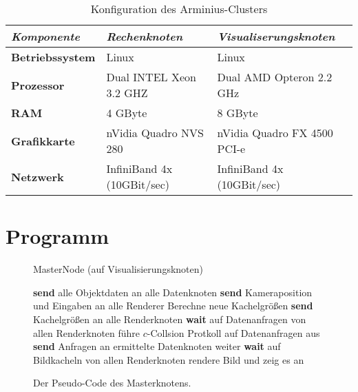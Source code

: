 \begin{table}
 \centering
 \begin{tabular}{lll} %
  \toprule %
  \textit{Komponente} & \textit{Rechenknoten} & \textit{Visualiserungsknoten} \\
  \midrule
  \textbf{Betriebssystem} & Linux & Linux \\
  \textbf{Prozessor} & Dual INTEL Xeon 3.2 GHZ & Dual AMD Opteron 2.2 GHz \\
  \textbf{RAM} & 4 GByte & 8 GByte \\
  \textbf{Grafikkarte} & nVidia Quadro NVS 280 & nVidia Quadro FX 4500 PCI-e \\
  \textbf{Netzwerk} & InfiniBand 4x (10GBit/sec) & InfiniBand 4x (10GBit/sec) \\
  \bottomrule
 \end{tabular} 
 \caption{Konfiguration des Arminius-Clusters}
 \label{tab:impl:arminius}
\end{table}

\section{Programm}
\label{sec:impl:program}

\begin{figure*}[ttt!]
\centering
 \begin{minipage}[t]{12cm}
\begin{algorithm}[H]
  \caption{MasterNode (auf Visualisierungsknoten)\label{fig:impl:masternode}} 
    \begin{algorithmic} [1]
      \STATE \textbf{send} alle Objektdaten an alle Datenknoten
	\STATE \textbf{send} Kameraposition und Eingaben an alle Renderer
	  \STATE Berechne neue Kachelgrößen
	  \STATE \textbf{send} Kachelgrößen an alle Renderknoten
	\ENDIF
	\STATE \textbf{wait} auf Datenanfragen von allen Renderknoten
	\STATE führe $c$-Collsion Protkoll auf Datenanfragen aus
	\STATE \textbf{send} Anfragen an ermittelte Datenknoten weiter
	\STATE \textbf{wait} auf Bildkacheln von allen Renderknoten
	\STATE rendere Bild und zeig es an
      \ENDWHILE
    \end{algorithmic}
\end{algorithm}
 \end{minipage}
\caption{Der Pseudo-Code des Masterknotens.}
\end{figure*}

